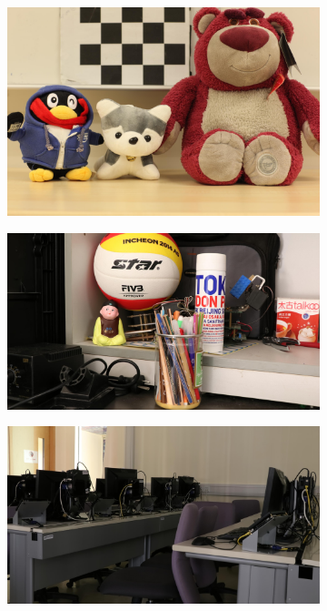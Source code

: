 \begin{figure}
\begin{subfigure}[t]{0.4\textwidth}
    \end{subfigure}
    \hfill
    \begin{subfigure}[t]{0.4\textwidth}
        \centering
        \includegraphics[width=1\textwidth]{images/dataset/Canon5D2_5_200_3200_toy_mean.JPG}
    \end{subfigure}
    \hfill
    \begin{subfigure}[t]{0.4\textwidth}
        \centering
        \includegraphics[width=1\textwidth]{images/dataset/Canon80D_8_8_3200_ball_mean.JPG}
    \end{subfigure}
    \hfill
    \begin{subfigure}[t]{0.4\textwidth}
        \centering
        \includegraphics[width=1\textwidth]{images/dataset/Canon80D_8_8_6400_comproom_mean.JPG}

\end{subfigure}
\end{figure}
